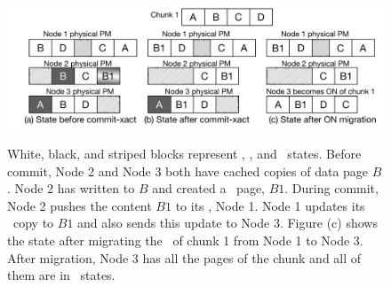 {
\begin{figure}[th]
\centering
\begin{center}
\centerline{\includegraphics[width=\columnwidth]{Figures/data-eg.pdf}}
\end{center}
\vspace{-0.2in}
{
White, black, and striped blocks represent \committed, \redundant, and \dirty\ states.
Before commit, Node 2 and Node 3 both have cached copies of 
data page $B$. Node 2 has written to $B$ and created a \dirty\ page, $B1$.
During commit, Node 2 pushes the content $B1$ to its \on, Node 1.
Node 1 updates its \committed\ copy to $B1$ and also sends this update to Node 3.
Figure (c) shows the state after migrating the \on\ of chunk 1 from Node 1 to Node 3. 
After migration, Node 3 has all the pages of the chunk and all of them are in \committed\ states.
}
\vspace{-0.1in}
\end{figure}
}
